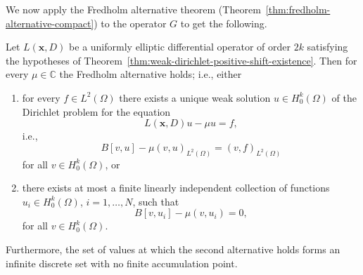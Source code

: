 We now apply the Fredholm alternative theorem (Theorem~\ref{thm:fredholm-alternative-compact}) to the operator $G$ to get the following.

\begin{Theorem}
\label{thm:elliptic-fredholm-alternative}
Let $L(\bm{x},D)$ be a uniformly elliptic differential operator of order $2k$ satisfying the hypotheses of Theorem~\ref{thm:weak-dirichlet-positive-shift-existence}. Then for every $\mu\in\mathbb{C}$ the Fredholm alternative holds; i.e., either\begin{enumerate}\item for every $f\in L^2(\Omega)$ there exists a unique weak solution $u\in H_0^k(\Omega)$ of the Dirichlet problem for the equation
\begin{equation}\label{eq:elliptic-fredholm-inhomogeneous-equation}
L(\bm{x},D)u-\mu u=f,
\end{equation}
i.e.,
\begin{equation}\label{eq:elliptic-fredholm-inhomogeneous-weak-equation}
B[v,u]-\mu(v,u)_{L^2(\Omega)}=(v,f)_{L^2(\Omega)}
\end{equation}
for all $v\in H_0^k(\Omega)$, or\item there exists at most a finite linearly independent collection of functions $u_i\in H_0^k(\Omega)$, $i=1,\ldots,N$, such that
\begin{equation}\label{eq:elliptic-fredholm-homogeneous-weak-equations}
B[v,u_i]-\mu(v,u_i)=0,
\end{equation}
for all $v\in H_0^k(\Omega)$.\end{enumerate}Furthermore, the set of values at which the second alternative holds forms an infinite discrete set with no finite accumulation point.
\end{Theorem}

